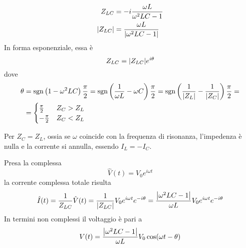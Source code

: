 \begin{align}
	Z_{LC}&=-i\frac{\omega L}{\omega^2 L C - 1} \\
	\abs{Z_{LC}}&=\frac{\omega L}{\abs{\omega^2 L C - 1}}
\end{align}
In forma esponenziale, essa è
\begin{equation*}
	Z_{LC}=\abs{Z_{LC}}e^{i\theta}
\end{equation*}
dove
\begin{align*}
	\theta&=\mathrm{sgn}\left(1-\omega^2 L C\right)\frac{\pi}{2}=\mathrm{sgn}\left(\frac{1}{\omega L} - \omega C\right)\frac{\pi}{2}=\mathrm{sgn}\left(\frac{1}{\abs{Z_L}} - \frac{1}{\abs{Z_C}}\right)\frac{\pi}{2}=\\
	&=\begin{cases}
		\frac{\pi}{2}&Z_C>Z_L\\
		-\frac{\pi}{2}&Z_C<Z_L	
	\end{cases}
\end{align*}
\begin{observe}
	Per $Z_C=Z_L$, ossia se $\omega$ coincide con la frequenza di risonanza, l'impedenza è nulla e la corrente si annulla, essendo $I_L=-I_C$.
\end{observe}
Presa la \ddp complessa
\begin{equation*}
	\hat{V}(t)=V_0e^{i\omega t}
\end{equation*}
la corrente complessa totale risulta
\begin{equation*}
	\hat{I}(t)=\frac{1}{Z_{LC}}\hat{V}(t)=\frac{1}{\abs{Z_{LC}}}V_0e^{i\omega t}e^{-i\theta}=\frac{\abs{\omega^2 L C - 1}}{\omega L}V_0e^{i\omega t}e^{-i\theta}
\end{equation*}
In termini non complessi il voltaggio è pari a
\begin{equation*}
	V(t)=\frac{\abs{\omega^2 L C - 1}}{\omega L}V_0\cos(\omega t -\theta)
\end{equation*}
